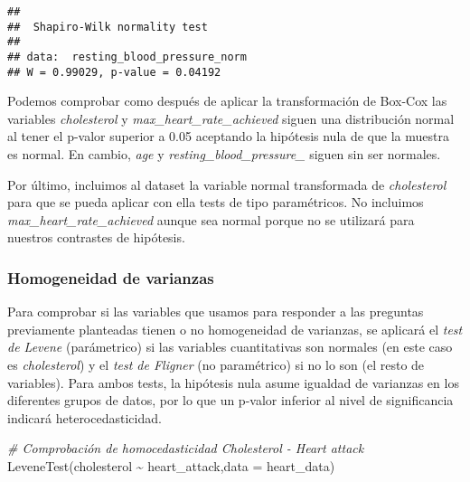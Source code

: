 \documentclass[
]{article}
\newenvironment{Shaded}{\begin{snugshade}}{\end{snugshade}}
\newcommand{\AttributeTok}[1]{\textcolor[rgb]{0.77,0.63,0.00}{#1}}
\newcommand{\CommentTok}[1]{\textcolor[rgb]{0.56,0.35,0.01}{\textit{#1}}}
\newcommand{\FunctionTok}[1]{\textcolor[rgb]{0.00,0.00,0.00}{#1}}
\newcommand{\NormalTok}[1]{#1}
\newcommand{\OtherTok}[1]{\textcolor[rgb]{0.56,0.35,0.01}{#1}}
\newcommand{\SpecialCharTok}[1]{\textcolor[rgb]{0.00,0.00,0.00}{#1}}
\begin{document}
\begin{verbatim}
## 
##  Shapiro-Wilk normality test
## 
## data:  resting_blood_pressure_norm
## W = 0.99029, p-value = 0.04192
\end{verbatim}

Podemos comprobar como después de aplicar la transformación de Box-Cox
las variables \emph{cholesterol} y \emph{max\_heart\_rate\_achieved}
siguen una distribución normal al tener el p-valor superior a 0.05
aceptando la hipótesis nula de que la muestra es normal. En cambio,
\emph{age} y \emph{resting\_blood\_pressure\_} siguen sin ser normales.

Por último, incluimos al dataset la variable normal transformada de
\emph{cholesterol} para que se pueda aplicar con ella tests de tipo
paramétricos. No incluimos \emph{max\_heart\_rate\_achieved} aunque sea
normal porque no se utilizará para nuestros contrastes de hipótesis.

\begin{Shaded}
\end{Shaded}

\hypertarget{homogeneidad-de-varianzas}{%
\subsubsection{Homogeneidad de
varianzas}\label{homogeneidad-de-varianzas}}

Para comprobar si las variables que usamos para responder a las
preguntas previamente planteadas tienen o no homogeneidad de varianzas,
se aplicará el \emph{test de Levene} (parámetrico) si las variables
cuantitativas son normales (en este caso es \emph{cholesterol}) y el
\emph{test de Fligner} (no paramétrico) si no lo son (el resto de
variables). Para ambos tests, la hipótesis nula asume igualdad de
varianzas en los diferentes grupos de datos, por lo que un p-valor
inferior al nivel de significancia indicará heterocedasticidad.

\begin{Shaded}
\begin{Highlighting}[]
\CommentTok{\# Comprobación de homocedasticidad Cholesterol {-} Heart attack}
\FunctionTok{LeveneTest}\NormalTok{(cholesterol }\SpecialCharTok{\textasciitilde{}}\NormalTok{ heart\_attack,}\AttributeTok{data =}\NormalTok{ heart\_data)}
\end{Highlighting}
\end{Shaded}
\end{document}
